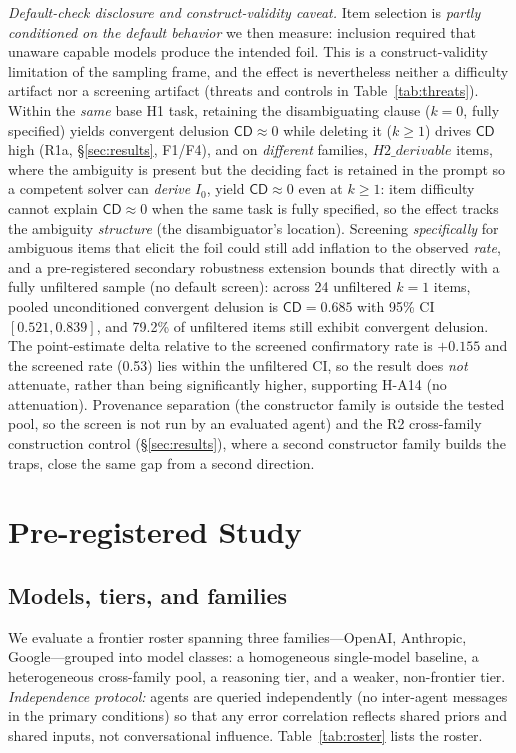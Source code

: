 \documentclass[acmsmall,screen,nonacm]{acmart}
\newcommand{\cd}{\textsf{CD}}
\begin{document}
\emph{Default-check disclosure and construct-validity caveat.} Item selection is \emph{partly conditioned on
the default behavior} we then measure: inclusion required that unaware capable models produce the intended
foil. This is a construct-validity limitation of the sampling frame, and the effect is nevertheless neither a
difficulty artifact nor a screening artifact (threats and controls in Table~\ref{tab:threats}). Within the
\emph{same} base H1 task, retaining the disambiguating clause ($k{=}0$, fully specified) yields convergent
delusion $\cd\!\approx\!0$ while deleting it ($k{\ge}1$) drives $\cd$ high (R1a, \S\ref{sec:results},
F1/F4), and on \emph{different} families, $H2\_derivable$ items, where the
ambiguity is present but the deciding fact is retained in the prompt so a competent solver can \emph{derive}
$I_0$, yield $\cd\!\approx\!0$ even at $k{\ge}1$: item difficulty cannot explain $\cd\!\approx\!0$ when the
same task is fully specified, so the effect tracks the ambiguity \emph{structure} (the disambiguator's
location). Screening \emph{specifically} for
ambiguous items that elicit the foil could still add inflation to the observed \emph{rate}, and a
pre-registered secondary robustness extension bounds that directly with a fully unfiltered sample
(no default screen): across 24 unfiltered $k{=}1$ items, pooled unconditioned convergent delusion is
$\cd=0.685$ with 95\% CI $[0.521,0.839]$, and 79.2\% of unfiltered items still exhibit convergent delusion.
The point-estimate delta relative to the screened confirmatory rate is $+0.155$ and the screened rate
(0.53) lies within the unfiltered CI, so the result does \emph{not} attenuate, rather than being
significantly higher, supporting H-A14 (no attenuation). Provenance
separation (the constructor family is outside the tested pool, so the screen is not run by an evaluated
agent) and the R2 cross-family construction control (\S\ref{sec:results}), where a second constructor
family builds the traps, close the same gap from a second direction.

\section{Pre-registered Study}
\label{sec:study}
\subsection{Models, tiers, and families}
We evaluate a frontier roster spanning three families---OpenAI, Anthropic, Google---grouped into model
classes: a homogeneous single-model baseline, a heterogeneous cross-family pool, a reasoning tier, and a
weaker, non-frontier tier. \emph{Independence protocol:} agents are queried independently (no inter-agent messages in
the primary conditions) so that any error correlation reflects shared priors and shared inputs, not
conversational influence. Table~\ref{tab:roster} lists the roster.
\end{document}
